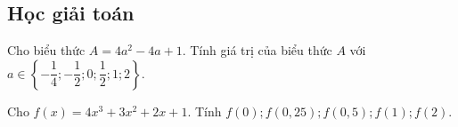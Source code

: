 \subsection{Học giải toán}
\begin{vd}%
	Cho biểu thức $A=4a^2-4a+1$. Tính giá trị của biểu thức $A$ với $a\in \left\lbrace -\dfrac{1}{4};-\dfrac{1}{2};0;\dfrac{1}{2};1;2\right\rbrace $.
\end{vd}
\begin{vd}%
	Cho $f(x)=4x^3+3x^2+2x+1$. Tính $f(0); f(0{,}25); f(0{,}5); f(1); f(2)$.
\end{vd}
